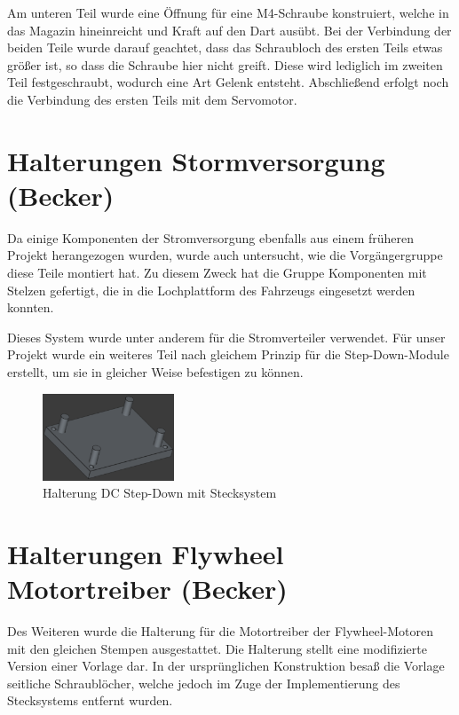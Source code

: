 Am unteren Teil wurde eine Öffnung für eine M4-Schraube konstruiert, welche in das Magazin hineinreicht und Kraft auf den Dart ausübt. 
Bei der Verbindung der beiden Teile wurde darauf geachtet, dass das Schraubloch des ersten Teils etwas größer ist, so dass die Schraube hier nicht greift. 
Diese wird lediglich im zweiten Teil festgeschraubt, wodurch eine Art Gelenk entsteht.
Abschließend erfolgt noch die Verbindung des ersten Teils mit dem Servomotor.

\section{Halterungen Stormversorgung (Becker)}

Da einige Komponenten der Stromversorgung ebenfalls aus einem früheren Projekt herangezogen wurden, wurde auch untersucht, wie die Vorgängergruppe diese Teile montiert hat.
Zu diesem Zweck hat die Gruppe Komponenten mit Stelzen gefertigt, die in die Lochplattform des Fahrzeugs eingesetzt werden konnten.

Dieses System wurde unter anderem für die Stromverteiler verwendet. 
Für unser Projekt wurde ein weiteres Teil nach gleichem Prinzip für die Step-Down-Module erstellt, um sie in gleicher Weise befestigen zu können.

\begin{figure}[ht]
    \centering
    \includegraphics[width=0.35\textwidth, keepaspectratio]{images/becker_cad_powerplate.png}
    \caption{Halterung DC Step-Down mit Stecksystem}
\end{figure}

\section{Halterungen Flywheel Motortreiber (Becker)}

Des Weiteren wurde die Halterung für die Motortreiber der Flywheel-Motoren mit den gleichen Stempen ausgestattet. 
Die Halterung stellt eine modifizierte Version einer Vorlage \cite{cad_flywheel_blueprint} dar. 
In der ursprünglichen Konstruktion besaß die Vorlage seitliche Schraublöcher, welche jedoch im Zuge der Implementierung des Stecksystems entfernt wurden.

